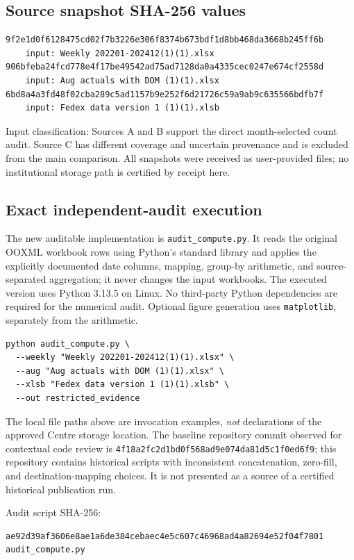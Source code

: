 \documentclass[11pt]{article}
\begin{document}
\subsection{Source snapshot SHA-256 values}
\begin{small}\begin{verbatim}
9f2e1d0f6128475cd02f7b3226e306f8374b673bdf1d8bb468da3668b245ff6b
    input: Weekly 202201-202412(1)(1).xlsx
906bfeba24fcd778e4f17be49542ad75ad7128da0a4335cec0247e674cf2558d
    input: Aug actuals with DOM (1)(1).xlsx
6bd8a4a3fd48f02cba289c5ad1157b9e252f6d21726c59a9ab9c635566bdfb7f
    input: Fedex data version 1 (1)(1).xlsb
\end{verbatim}\end{small}
Input classification: Sources A and B support the direct month-selected count audit. Source C has different coverage and uncertain provenance and is excluded from the main comparison. All snapshots were received as user-provided files; no institutional storage path is certified by receipt here.

\subsection{Exact independent-audit execution}
The new auditable implementation is \texttt{audit\_compute.py}. It reads the original OOXML workbook rows using Python's standard library and applies the explicitly documented date columns, mapping, group-by arithmetic, and source-separated aggregation; it never changes the input workbooks. The executed version uses Python 3.13.5 on Linux. No third-party Python dependencies are required for the numerical audit. Optional figure generation uses \texttt{matplotlib}, separately from the arithmetic.
\begin{verbatim}
python audit_compute.py \
  --weekly "Weekly 202201-202412(1)(1).xlsx" \
  --aug "Aug actuals with DOM (1)(1).xlsx" \
  --xlsb "Fedex data version 1 (1)(1).xlsb" \
  --out restricted_evidence
\end{verbatim}
\noindent The local file paths above are invocation examples, \emph{not} declarations of the approved Centre storage location. The baseline repository commit observed for contextual code review is \texttt{4f18a2fc2d1bd0f568ad9e074da81d5c1f0ed6f9}; this repository contains historical scripts with inconsistent concatenation, zero-fill, and destination-mapping choices. It is not presented as a source of a certified historical publication run.

\noindent Audit script SHA-256:
\begin{small}\begin{verbatim}
ae92d39af3606e8ae1a6de384cebaec4e5c607c46968ad4a82694e52f04f7801  audit_compute.py
\end{verbatim}\end{small}
\end{document}
